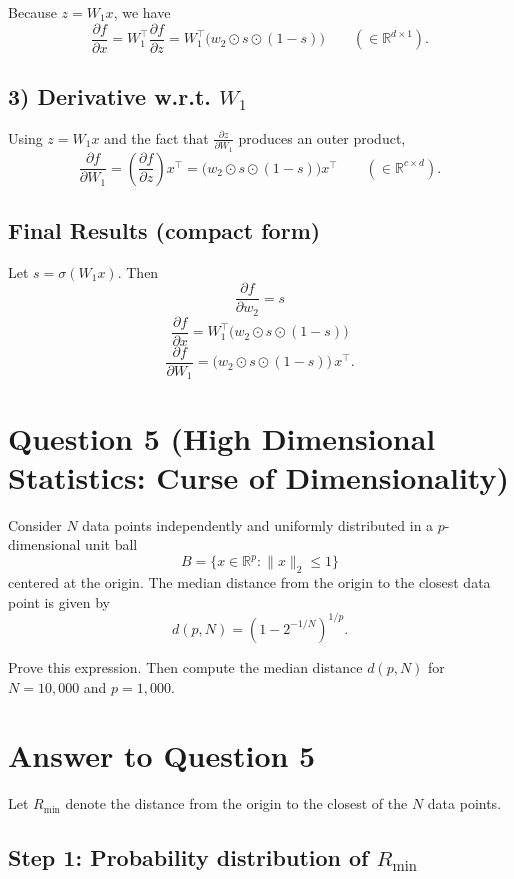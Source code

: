 \documentclass{article}
\begin{document}
Because $z=W_1 x$, we have
\[
\frac{\partial f}{\partial x}
=
W_1^\top \frac{\partial f}{\partial z}
=
W_1^\top \bigl(w_2 \odot s \odot (1-s)\bigr)
\qquad (\in \mathbb{R}^{d\times 1}).
\]

\subsection*{3) Derivative w.r.t. $W_1$}
Using $z=W_1x$ and the fact that $\frac{\partial z}{\partial W_1}$ produces an outer product,
\[
\frac{\partial f}{\partial W_1}
=
\left(\frac{\partial f}{\partial z}\right) x^\top
=
\bigl(w_2 \odot s \odot (1-s)\bigr) x^\top
\qquad (\in \mathbb{R}^{c\times d}).
\]

\subsection*{Final Results (compact form)}
Let $s=\sigma(W_1x)$. Then
\[
\boxed{\frac{\partial f}{\partial w_2}=s}
\]
\[
\boxed{\frac{\partial f}{\partial x}=W_1^\top\bigl(w_2\odot s\odot(1-s)\bigr)}
\]
\[
\boxed{\frac{\partial f}{\partial W_1}=\bigl(w_2\odot s\odot(1-s)\bigr)\,x^\top.}
\]

\newpage
\section*{Question 5 (High Dimensional Statistics: Curse of Dimensionality)}

Consider $N$ data points independently and uniformly distributed in a
$p$-dimensional unit ball
\[
B=\{x\in\mathbb{R}^p : \|x\|_2 \le 1\}
\]
centered at the origin. The median distance from the origin to the closest
data point is given by
\[
d(p,N)=\left(1-2^{-1/N}\right)^{1/p}.
\]

Prove this expression. Then compute the median distance $d(p,N)$ for
$N=10{,}000$ and $p=1{,}000$.

\section*{Answer to Question 5}

Let $R_{\min}$ denote the distance from the origin to the closest of the
$N$ data points.

\subsection*{Step 1: Probability distribution of $R_{\min}$}
\end{document}
